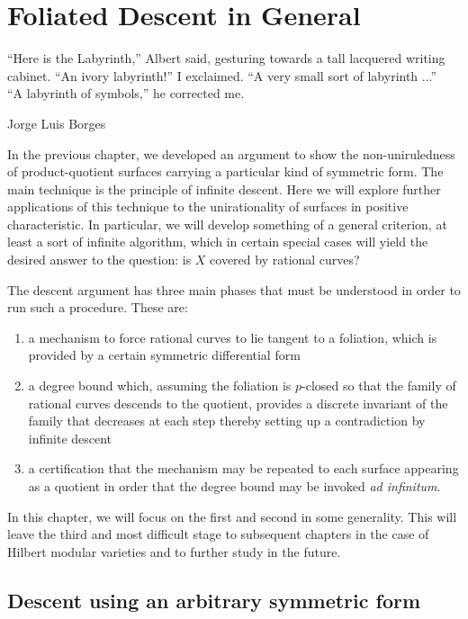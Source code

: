 \documentclass[main.tex]{subfiles}
\begin{document}
\chapter{Foliated Descent in General} \label{chapter:descent}
\epigraph{%
``Here is the Labyrinth,'' Albert said, gesturing towards a tall lacquered writing cabinet. ``An ivory labyrinth!'' I exclaimed. ``A very small sort of labyrinth ...'' \\ ``A labyrinth of symbols,'' he corrected me. 
}{Jorge Luis Borges}

In the previous chapter, we developed an argument to show the non-uniruledness of product-quotient surfaces carrying a particular kind of symmetric form. The main technique is the principle of infinite descent. Here we will explore further applications of this technique to the unirationality of surfaces in positive characteristic. In particular, we will develop something of a general criterion, at least a sort of infinite algorithm, which in certain special cases will yield the desired answer to the question: is $X$ covered by rational curves?

The descent argument has three main phases that must be understood in order to run such a procedure. These are:
\begin{enumerate}
\item a mechanism to force rational curves to lie tangent to a foliation, which is provided by a certain symmetric differential form
\item a degree bound which, assuming the foliation is $p$-closed so that the family of rational curves descends to the quotient, provides a discrete invariant of the family that decreases at each step thereby setting up a contradiction by infinite descent
\item a certification that the mechanism may be repeated to each surface appearing as a quotient in order that the degree bound may be invoked \textit{ad infinitum}.  
\end{enumerate}

In this chapter, we will focus on the first and second in some generality. This will leave the third and most difficult stage to subsequent chapters in the case of Hilbert modular varieties and to further study in the future. 

\section{Descent using an arbitrary symmetric form}
\end{document}
